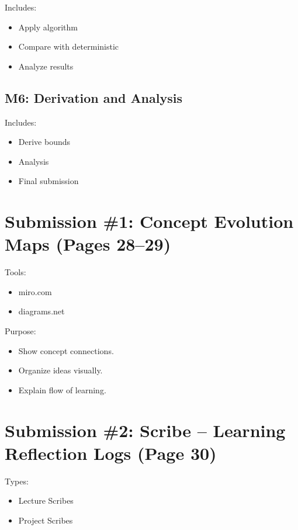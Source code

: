 \documentclass[12pt]{article}
\begin{document}
Includes:

\begin{itemize}
\item Apply algorithm
\item Compare with deterministic
\item Analyze results
\end{itemize}

\subsection{M6: Derivation and Analysis}

Includes:

\begin{itemize}
\item Derive bounds
\item Analysis
\item Final submission
\end{itemize}

\section{Submission \#1: Concept Evolution Maps (Pages 28--29)}

Tools:

\begin{itemize}
\item miro.com
\item diagrams.net
\end{itemize}

Purpose:

\begin{itemize}
\item Show concept connections.
\item Organize ideas visually.
\item Explain flow of learning.
\end{itemize}

\section{Submission \#2: Scribe -- Learning Reflection Logs (Page 30)}

Types:

\begin{itemize}
\item Lecture Scribes
\item Project Scribes
\end{itemize}
\end{document}

